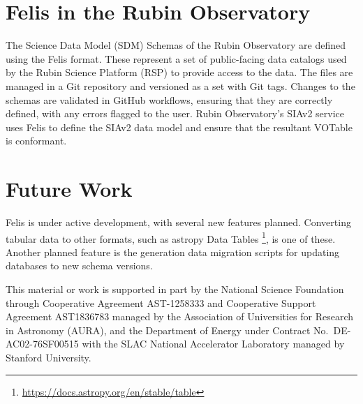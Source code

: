 \documentclass[11pt,twoside]{article}
\begin{document}
\section{Felis in the Rubin Observatory}

The Science Data Model (SDM) Schemas of the Rubin Observatory \citep[e.g.,][]{LSE-163} are defined using the Felis format.
These represent a set of public-facing data catalogs used by the Rubin Science Platform (RSP) to provide access to the data.
The files are managed in a Git repository and versioned as a set with Git tags.
Changes to the schemas are validated in GitHub workflows, ensuring that they are correctly defined, with any errors flagged to the user.
Rubin Observatory's SIAv2 service \citep{P920_adassxxxiv} uses Felis to define the SIAv2 data model and ensure that the resultant VOTable is conformant.

\section{Future Work}

Felis is under active development, with several new features planned.
Converting tabular data to other formats, such as astropy Data Tables \footnote{\url{https://docs.astropy.org/en/stable/table}}, is one of these.
Another planned feature is the generation data migration scripts for updating databases to new schema versions.

\acknowledgments This material or work is supported in part by the National Science Foundation through Cooperative Agreement AST-1258333 and Cooperative Support Agreement AST1836783 managed by the Association of Universities for Research in Astronomy (AURA), and the Department of Energy under Contract No.\ DE-AC02-76SF00515 with the SLAC National Accelerator Laboratory managed by Stanford University.


\end{document}
